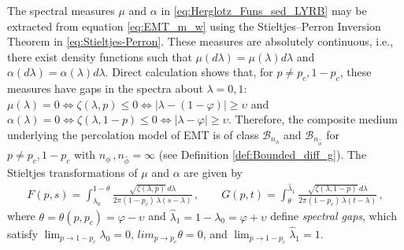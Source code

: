 \documentclass[english,12pt,jmp,graphicx]{revtex4-1}
\newcommand{\ph}{\hat{\phi}}
\begin{document}
The spectral measures $\mu$ and $\alpha$ in \eqref{eq:Herglotz_Funs_sed_LYRB}
may be extracted from equation \eqref{eq:EMT_m_w} using the Stieltjes--Perron
Inversion Theorem in \eqref{eq:Stieltjes-Perron}. These measures are
absolutely continuous, i.e., there exist density functions such that
$\mu(d\lambda)=\mu(\lambda)d\lambda$ and $\alpha(d\lambda)=\alpha(\lambda)d\lambda$. Direct calculation shows
that, for $p\neq p_c,1-p_c$, these measures have gaps in the spectra
about $\lambda=0,1$: $\mu(\lambda)=0\iff\zeta(\lambda,p)\leq0\iff|\lambda-(1-\varphi)|\geq\upsilon$ and
$\alpha(\lambda)=0\iff\zeta(\lambda,1-p)\leq0\iff|\lambda-\varphi|\geq\upsilon$. Therefore, the composite medium
underlying the percolation model of EMT \cite{MILTON:2002:TC} is of class $\mathcal{B}_{n_\phi}$
and $\mathcal{B}_{n_{\ph}}$ for $p\neq p_c,1-p_c$ with $n_\phi\,,n_{\ph}=\infty$
(see Definition \ref{def:Bounded_diff_g}).  
The Stieltjes transformations of $\mu$ and $\alpha$ are given by 
%
\begin{align}\label{eq:EFM_Fs_Gt}
  F(p,s)%
      =\int_{\lambda_0}^{1-\theta}\frac{\sqrt{\zeta(\lambda,p)}\,d\lambda}{2\pi(1-p_c)\,\lambda(s-\lambda)}\,,
      \qquad 
  G(p,t)%
      =\int_{\theta}^{\hat{\lambda}_1}\frac{\sqrt{\zeta(\lambda,1-p)}\,d\lambda}{2\pi(1-p_c)\,\lambda(t-\lambda)}\,,
\end{align}
%
where $\theta=\theta(p,p_c)=\varphi-\upsilon$ and $\hat{\lambda}_1=1-\lambda_0=\varphi+\upsilon$ define \emph{spectral
  gaps}, which satisfy $\lim_{p\to1-p_c}\lambda_0=0$, $lim_{p\to p_c}\theta=0$,
and $\lim_{p\to1-p_c}\hat{\lambda}_1=1$. 
\end{document}
